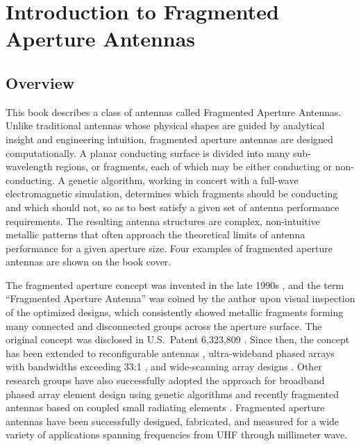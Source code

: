 \chapter{Introduction to Fragmented Aperture Antennas}

\section{Overview}

This book describes a class of antennas called Fragmented Aperture Antennas.  Unlike traditional antennas whose physical shapes are guided by analytical insight and engineering intuition, fragmented aperture antennas are designed computationally.  A planar conducting surface is divided into many sub-wavelength regions, or fragments, each of which may be either conducting or non-conducting.  A genetic algorithm, working in concert with a full-wave electromagnetic simulation, determines which fragments should be conducting and which should not, so as to best satisfy a given set of antenna performance requirements.  The resulting antenna structures are complex, non-intuitive metallic patterns that often approach the theoretical limits of antenna performance for a given aperture size.  Four examples of fragmented aperture antennas are shown on the book cover.

The fragmented aperture concept was invented in the late 1990s \cite{MaloneyKeslerHarms}, and the term ``Fragmented Aperture Antenna'' was coined by the author upon visual inspection of the optimized designs, which consistently showed metallic fragments forming many connected and disconnected groups across the aperture surface.  The original concept was disclosed in U.S.\ Patent 6,323,809 \cite{MaloneyFragPatent}.  Since then, the concept has been extended to reconfigurable antennas \cite{Pringle2004Reconfigurable}, ultra-wideband phased arrays with bandwidths exceeding 33:1 \cite{Landgren2019Broadband}, and wide-scanning array designs \cite{Maloney2011Wide}.  Other research groups have also successfully adopted the approach for broadband phased array element design using genetic algorithms \cite{Thors2005Broad-band} and recently fragmented antennas based on coupled small radiating elements \cite{Barani2018Fragmented}.  Fragmented aperture antennas have been successfully designed, fabricated, and measured for a wide variety of applications spanning frequencies from UHF through millimeter wave.

